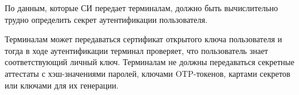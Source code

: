 \label{R.AP.Term2}
По данным, которые СИ передает терминалам, должно быть вычислительно трудно 
определить секрет аутентификации пользователя. 

\begin{note*}
Терминалам может передаваться сертификат открытого ключа пользователя
и тогда в ходе аутентификации терминал проверяет, что пользователь 
знает соответствующий личный ключ. Терминалам не должны передаваться 
секретные аттестаты с хэш-значениями паролей, ключами OTP-токенов, картами 
секретов или ключами для их генерации.
\end{note*}


%
%
